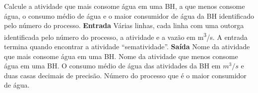 \documentclass[a4paper, 12pt]{article}
\begin{document}
Calcule a atividade que mais consome água em uma BH, a que menos consome água, o consumo médio de água e o maior consumidor de água da BH identificado pelo número do processo.
\newline \newline
\textbf{{\large Entrada}} \newline
Várias linhas, cada linha com uma outorga identificada pelo número do processo, a atividade e a vazão em m\textsuperscript{3}/s. \newline
A entrada termina quando encontrar a atividade “sem\textunderscore atividade”.
\newline \newline
\textbf{{\large Saída}} \newline
Nome da atividade que mais consome água em uma BH. \newline
Nome da atividade que menos consome água em uma BH. \newline
O consumo médio de água das atividades da BH em $m^3/s$ e duas casas decimais de precisão. \newline
Número do processo que é o maior consumidor de água.
\newline \newline
\newline
\end{document}

